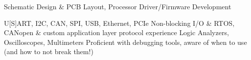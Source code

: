 \documentclass[../main.tex]{subfiles}%
\begin{document}
%
{Schematic Design \& PCB Layout, Processor Driver/Firmware
Development}{}
%
{\begin{adjustwidth}{1.2in}{0in}
	{U[S]ART, I2C, CAN, SPI, USB, Ethernet, PCIe}
	{Non-blocking I/O \& RTOS, CANopen \& custom application layer
		protocol experience}
	{Logic Analyzers, Oscilloscopes, Multimeters}
	{Proficient with debugging tools, aware of when to use
		(and how to not break them!)}
\end{adjustwidth}}
\end{document}

